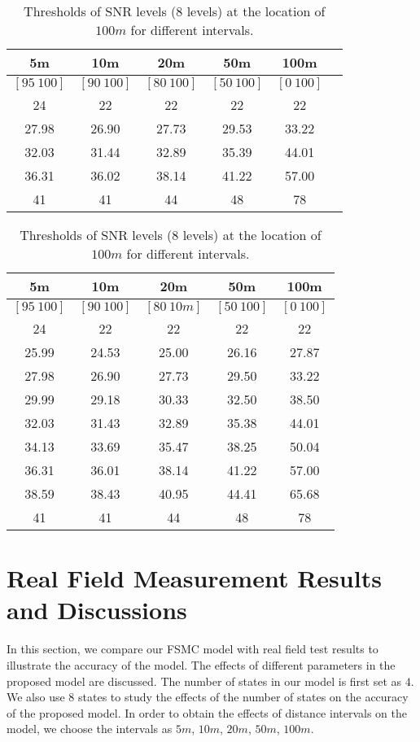 \documentclass[conference]{IEEEtran}
\begin{document}
\begin{table}[tp]
\caption{Thresholds of SNR levels ($4$ levels) at the location of $100m$ for different intervals.}
\label{Thresholds_4}
\begin{tabular}{|c|c|c|c|c|c|}
\hline
5m&10m&20m&50m&100m\\ \hline
$[95~100]$&$[90~100]$&$[80~100]$&$[50~100]$&$[0~100]$\\ \hline
24	    &22	    &22     &22     &22\\ \hline
27.98	&26.90	&27.73  &29.53	&33.22\\ \hline
32.03	&31.44	&32.89	&35.39	&44.01\\ \hline
36.31	&36.02  &38.14	&41.22	&57.00\\ \hline
41	&41     &44	    &48     &78\\ \hline
\end{tabular}
\caption{Thresholds of SNR levels ($8$ levels) at the location of $100m$ for different intervals.}
\label{Thresholds_8}
\begin{tabular}{|c|c|c|c|c|}
\hline
5m          &10m        &20m          &50m         &100m     \\ \hline
$[95~100]$&$[90~100]$&$[80~10m]$&$[50~100]$&$[0~100]$\\ \hline
24	    &22	    &22     &22     &22\\ \hline
25.99	&24.53	&25.00  &26.16	&27.87\\ \hline
27.98	&26.90	&27.73	&29.50	&33.22\\ \hline
29.99	&29.18  &30.33	&32.50	&38.50\\ \hline
32.03	&31.43  &32.89  &35.38  &44.01\\ \hline
34.13	&33.69	&35.47  &38.25	&50.04\\ \hline
36.31	&36.01	&38.14	&41.22	&57.00\\ \hline
38.59	&38.43  &40.95	&44.41	&65.68\\ \hline
41	    &41     &44	    &48     &78   \\ \hline
\end{tabular}
\end{table}

\section{Real Field Measurement Results and Discussions}
\label{Sec_TestandDiscussion}
In this section, we compare our FSMC model with real field test results to illustrate the accuracy  of the model. The effects of different parameters in the proposed model are discussed. The number of states in our model is first set as $4$. We also use $8$ states to study the effects of the number of states on the  accuracy of the proposed model. In order to obtain the effects of distance intervals on the model, we choose the intervals as $5m$, $10m$, $20m$, $50m$, $100m$.
\end{document}
